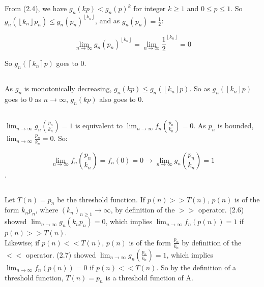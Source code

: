 \documentclass{article}
\begin{document}
\subsection{}
From (2.4), we have $g_n(kp) < g_n(p)^k$ for integer $k \ge 1$ and $0 \le p \le 1$. So $g_n(\left \lfloor{k_n}\right \rfloor p_n) \le g_n(p_n)^{\left \lfloor{k_n}\right \rfloor}$, and as $g_n(p_n) = \frac{1}{2}$: 

$$\lim_{n\to\infty} g_n(p_n)^{\left \lfloor{k_n}\right \rfloor} = \lim_{n\to\infty} \frac{1}{2}^{\left \lfloor{k_n}\right \rfloor} = 0$$

So $g_n(\left \lceil{k_n}\right \rceil p)$ goes to 0.

\subsection{}
As $g_n$ is monotonically decreasing, $g_n(kp) \le g_n(\left \lfloor{k_n}\right \rfloor p)$. So as $g_n(\left \lfloor{k_n}\right \rfloor p)$ goes to 0 as $n \to \infty$, $g_n(kp)$ also goes to 0.

\subsection{}
$\lim_{n\to\infty} g_n(\frac{p_n}{k_n}) = 1$ is equivalent to $\lim_{n\to\infty} f_n\left(\frac{p_n}{k_n}\right)=0$. As $p_n$ is bounded, $\lim_{n\to\infty} \frac{p_n}{k_n} = 0$. So:

$$\lim_{n\to\infty} f_n\left(\frac{p_n}{k_n}\right) = f_n(0) = 0 \rightarrow \lim_{n\to\infty} g_n\left(\frac{p_n}{k_n}\right) = 1$$.

\subsection{}
Let $T(n) = p_n$ be the threshold function. If $p(n) >> T(n)$, $p(n)$ is of the form $k_n p_n$, where $(k_n)_{n \ge 1} \to \infty$, by definition of the $>>$ operator. (2.6) showed $\lim_{n\to\infty} g_n(k_n p_n) = 0$, which implies $\lim_{n\to\infty} f_n(p(n)) = 1$ if $p(n) >> T(n)$.\\

Likewise; if $p(n) << T(n)$, $p(n)$ is of the form $\frac{p_n}{k_n}$ by definition of the $<<$ operator. (2.7) showed $\lim_{n\to\infty} g_n(\frac{p_n}{k_n}) = 1$, which implies $\lim_{n\to\infty} f_n(p(n)) = 0$ if $p(n) << T(n)$. So by the definition of a threshold function, $T(n) = p_n$ is a threshold function of A.
\end{document}
